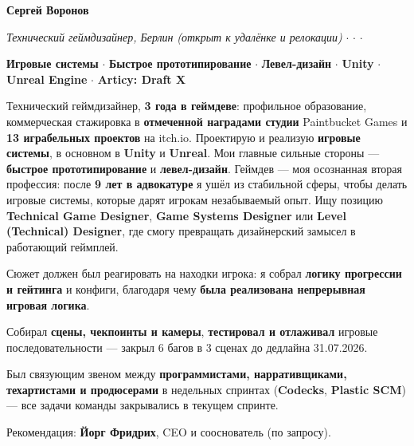 \documentclass[10pt]{article}
\begin{document}
{\LARGE\textbf{Сергей Воронов}}\hfill {}\par
\vspace{2pt}
{\large\itshape Технический геймдизайнер, Берлин} {\itshape (открыт к удалёнке и релокации)}\hfill
{} $\cdot$
 $\cdot$
 $\cdot$
\par
\vspace{4pt}
\textbf{Игровые системы} $\cdot$ \textbf{Быстрое прототипирование} $\cdot$ \textbf{Левел-дизайн} $\cdot$ \textbf{Unity} $\cdot$ \textbf{Unreal Engine} $\cdot$ \textbf{Articy: Draft X}\par

Технический геймдизайнер, \textbf{3 года в геймдеве}: профильное образование, коммерческая стажировка в \textbf{отмеченной наградами студии}
Paintbucket Games и \textbf{13 играбельных проектов} на itch.io. Проектирую и реализую \textbf{игровые системы},
в основном в \textbf{Unity} и \textbf{Unreal}. Мои главные сильные стороны --- \textbf{быстрое прототипирование}
и \textbf{левел-дизайн}. Геймдев --- моя осознанная вторая профессия: после \textbf{9 лет в адвокатуре} я ушёл из
стабильной сферы, чтобы делать игровые системы, которые дарят игрокам незабываемый опыт. Ищу позицию \textbf{Technical Game Designer}, \textbf{Game Systems Designer} или \textbf{Level (Technical) Designer}, где смогу превращать
дизайнерский замысел в работающий геймплей. 

\begin{points}
  \item Сюжет должен был реагировать на находки игрока: я собрал \textbf{логику прогрессии и гейтинга} и конфиги, благодаря чему \textbf{была реализована непрерывная игровая логика}.
  \item Собирал \textbf{сцены, чекпоинты и камеры}, \textbf{тестировал и отлаживал} игровые последовательности ---
        закрыл 6 багов в 3 сценах до дедлайна 31.07.2026.
  \item Был связующим звеном между \textbf{программистами, нарративщиками, техартистами и продюсерами}
        в недельных спринтах (\textbf{Codecks}, \textbf{Plastic SCM}) --- все задачи команды закрывались в текущем спринте.
  \item Рекомендация: \textbf{Йорг Фридрих}, CEO и сооснователь (по запросу).
\end{points}
\end{document}
